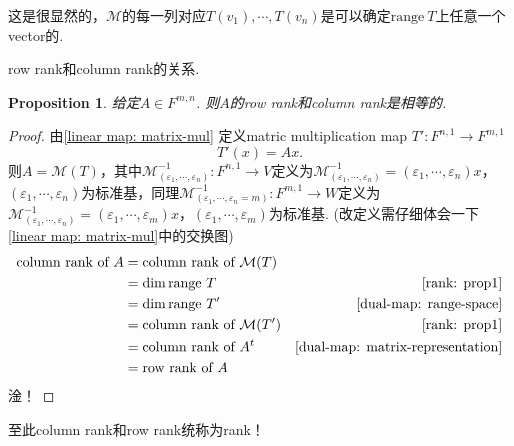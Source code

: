\documentclass{article}
\newtheorem{proposition}[theorem]{Proposition}
\newcommand*{\xfunc}[4]{{#2}\colon{#3}{#1}{#4}}
\newcommand*{\func}[3]{\xfunc{\to}{#1}{#2}{#3}}
\newcommand\range[1]{\text{range}\ #1}
\begin{document}
这是很显然的，$\mathcal{M}$的每一列对应$T(v_1),\cdots,T(v_n)$是可以确定$\range{T}$上任意一个vector的.

{\color{red} row rank和column rank的关系}.
\begin{proposition}
\rm 给定$A \in F^{m,n}$. 则$A$的row rank和column rank是相等的.
\end{proposition}

\begin{proof}
由\ref{linear map: matrix-mul} 定义matric multiplication map $\func{T'}{F^{n,1}}{F^{m,1}}$
$$
T'(x) = Ax.
$$
则$A = \mathcal{M}(T)$，其中$\mathcal{M}^{-1}_{(\varepsilon_1,\cdots,\varepsilon_n)}\colon F^{n,1} \rightarrow V$定义为$ \mathcal{M}^{-1}_{(\varepsilon_1,\cdots,\varepsilon_n)}= (\varepsilon_1,\cdots,\varepsilon_n)x$，$(\varepsilon_1,\cdots,\varepsilon_n)$为标准基，同理$\mathcal{M}^{-1}_{(\varepsilon_1,\cdots,\varepsilon_n=m)}\colon F^{m,1} \rightarrow W$定义为$ \mathcal{M}^{-1}_{(\varepsilon_1,\cdots,\varepsilon_n)}= (\varepsilon_1,\cdots,\varepsilon_m)x$，$(\varepsilon_1,\cdots,\varepsilon_m)$为标准基. ({\color{blue}改定义需仔细体会一下\ref{linear map: matrix-mul}中的交换图})
$$
\begin{aligned}
\text{column rank of } A &= \text{column rank of } \mathcal{M}(T) \\
						 &= \dim \range{T} & \ref{rank: prop1} \\
						 &= \dim \range{T'} & \ref{dual-map: range-space}\\
						 &= \text{column rank of } \mathcal{M}(T') & \ref{rank: prop1}\\
						 &= \text{column rank of } A^{t} & \ref{dual-map: matrix-representation}\\
						 &= \text{row rank of } A 	
\end{aligned}
$$
淦！
\end{proof}

{\color{blue} 至此column rank和row rank统称为rank}！
\end{document}
